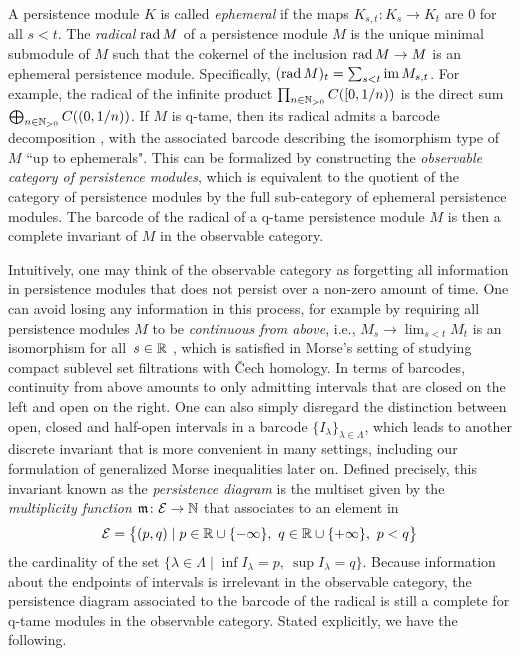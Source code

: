 A persistence module $K$ is called \emph{ephemeral} if the maps $K_{s,t} \colon K_s \to K_t$ are $0$ for all $s < t$.
The \emph{radical} $\operatorname{rad} M$ of a persistence module $M$ is the unique minimal submodule of $M$ such that the cokernel of the inclusion $\operatorname{rad} M \to M$ is an ephemeral persistence module.
Specifically, $(\operatorname{rad} M)_t = \sum_{s<t}\operatorname{im} M_{s,t}$.
For example, the radical of the infinite product $\prod_{n \in \mathbb{N}_{> 0}} C([0,1/n))$ is the direct sum $\bigoplus_{n \in \mathbb{N}_{> 0}} C((0,1/n))$.
If $M$ is q-tame, then its radical admits a barcode decomposition \cite[Corollary~3.6]{Chazal.2016b},
with the associated barcode describing the isomorphism type of~$M$ ``up to ephemerals".
This can be formalized by constructing the \emph{observable category of persistence modules}, which is equivalent to the quotient of the category of persistence modules by the full sub-category of ephemeral persistence modules.
The barcode of the radical of a q-tame persistence module $M$ is then a complete invariant of $M$ in the observable category.

Intuitively, one may think of the observable category as forgetting all information in persistence modules that does not persist over a non-zero amount of time.
One can avoid losing any information in this process, for example by requiring all persistence modules $M$ to be \emph{continuous from above}, i.e., $M_{s} \to \lim_{s < t} M_{t}$ is an isomorphism for all~$s \in \mathbb{R}$ \cite{Schmahl.2021}, which is satisfied in Morse's setting of studying compact sublevel set filtrations with \v{C}ech homology.
In terms of barcodes, continuity from above amounts to only admitting intervals that are closed on the left and open on the right.
One can also simply disregard the distinction between open, closed and half-open intervals in a barcode $\{I_{\lambda}\}_{\lambda \in \Lambda}$, which leads to another discrete invariant that is more convenient in many settings, including our formulation of generalized Morse inequalities later on.
Defined precisely, this invariant known as the \emph{persistence diagram} is the multiset given by the \emph{multiplicity function} $\mathfrak{m} \colon \mathcal{E} \to \mathbb{N}$ that associates to an element in
\begin{equation*}
\mathcal{E} =
\big\{ (p,q) \mid p \in \mathbb{R} \cup \{-\infty\}, \ q \in \mathbb{R} \cup \{+\infty\}, \ p < q \big\}
\end{equation*}
the cardinality of the set $\{ \lambda \in \Lambda \mid \inf I_{\lambda} = p,\ \sup I_{\lambda} = q\}$.
Because information about the endpoints of intervals is irrelevant in the observable category, the persistence diagram associated to the barcode of the radical is still a complete for q-tame modules in the observable category. %
Stated explicitly, we have the following.

